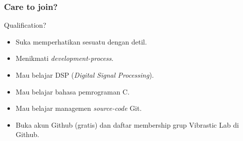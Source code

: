 \documentclass[table,dvipsnames,10pt]{beamer}
\begin{document}
	\begin{frame}
	\frametitle{Care to join?}
	\begin{exampleblock}{Qualification?}
		\begin{itemize}
			\item Suka memperhatikan sesuatu dengan detil.
			\item Menikmati \textit{development-process}.
			\item Mau belajar DSP (\textit{Digital Signal Processing}).
			\item Mau belajar bahasa pemrograman C.
			\item Mau belajar managemen \textit{source-code} Git.
			\item Buka akun Github (gratis) dan daftar membership grup Vibrastic Lab di Github.
		\end{itemize}
	\end{exampleblock}
\end{frame}
	
\end{document}
